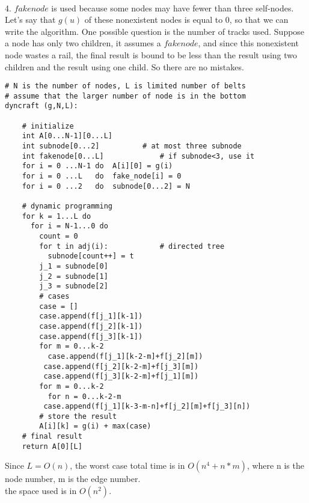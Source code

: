 \documentclass[12pt,a4paper]{article}
\newcommand{\question}[1]{\bigskip\noindent{\textbf{Q{#1} solution}}}
\begin{document}
\\4. $fakenode$ is used because some nodes may have fewer than three self-nodes. Let's say that $g(u)$ of these nonexistent nodes is equal to 0, so that we can write the algorithm. One possible question is the number of tracks used. Suppose a node has only two children, it assumes a $fakenode$, and since this nonexistent node wastes a rail, the final result is bound to be less than the result using two children and the result using one child. So there are no mistakes.\\
\begin{lstlisting}
# N is the number of nodes, L is limited number of belts
# assume that the larger number of node is in the bottom
dyncraft (g,N,L):  

	# initialize
	int A[0...N-1][0...L]
	int subnode[0...2]  		# at most three subnode
	int fakenode[0...L] 			# if subnode<3, use it
	for i = 0 ...N-1 do  A[i][0] = g(i)
	for i = 0 ...L 	 do  fake_node[i] = 0
	for i = 0 ...2 	 do  subnode[0...2] = N
	
	# dynamic programming
	for k = 1...L do
	  for i = N-1...0 do
	    count = 0
	    for t in adj(i):  			# directed tree
	      subnode[count++] = t
	    j_1 = subnode[0]
	    j_2 = subnode[1]
	    j_3 = subnode[2]
	    # cases
	    case = []
	    case.append(f[j_1][k-1])
	    case.append(f[j_2][k-1])
	    case.append(f[j_3][k-1])
	    for m = 0...k-2
	      case.append(f[j_1][k-2-m]+f[j_2][m]) 
		 case.append(f[j_2][k-2-m]+f[j_3][m])
		 case.append(f[j_3][k-2-m]+f[j_1][m])
	    for m = 0...k-2
	      for n = 0...k-2-m
		 case.append(f[j_1][k-3-m-n]+f[j_2][m]+f[j_3][n])
	    # store the result
	    A[i][k] = g(i) + max(case)
	# final result
	return A[0][L]

\end{lstlisting}
Since $L = O(n)$, the worst case total time is in $O(n^4 + n*m)$, where n is the node number, m is the edge number.\\
the space used is in $O(n^2)$.\\
\question{27.A}

\question{27.B}
\end{document}

